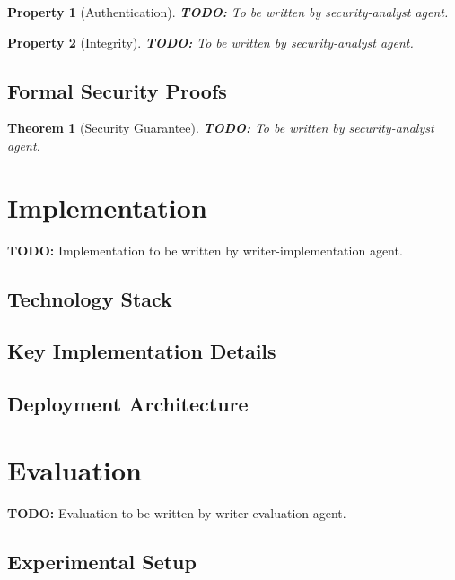 \documentclass[10pt,journal,compsoc]{IEEEtran}
\newtheorem{theorem}{Theorem}
\newtheorem{property}{Property}
\begin{document}
\begin{property}[Authentication]
\label{prop:authentication}
\textbf{TODO:} To be written by security-analyst agent.
\end{property}

\begin{property}[Integrity]
\label{prop:integrity}
\textbf{TODO:} To be written by security-analyst agent.
\end{property}

\subsection{Formal Security Proofs}
\label{subsec:proofs}

\begin{theorem}[Security Guarantee]
\label{thm:security}
\textbf{TODO:} To be written by security-analyst agent.
\end{theorem}

\section{Implementation}
\label{sec:implementation}
\textbf{TODO:} Implementation to be written by writer-implementation agent.

\subsection{Technology Stack}
\label{subsec:tech-stack}

\subsection{Key Implementation Details}
\label{subsec:implementation-details}

\subsection{Deployment Architecture}
\label{subsec:deployment}

\section{Evaluation}
\label{sec:evaluation}
\textbf{TODO:} Evaluation to be written by writer-evaluation agent.

\subsection{Experimental Setup}
\label{subsec:setup}
\end{document}
